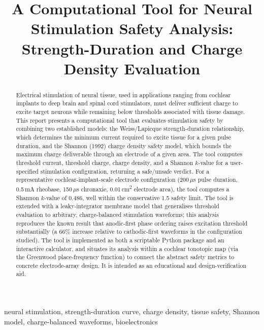 \documentclass[conference]{IEEEtran}
\begin{document}
\title{A Computational Tool for Neural Stimulation Safety Analysis: Strength-Duration and Charge Density Evaluation}

\author{
}

\maketitle

\begin{abstract}
Electrical stimulation of neural tissue, used in applications ranging from cochlear implants to deep brain and spinal cord stimulators, must deliver sufficient charge to excite target neurons while remaining below thresholds associated with tissue damage. This report presents a computational tool that evaluates stimulation safety by combining two established models: the Weiss/Lapicque strength-duration relationship, which determines the minimum current required to excite tissue for a given pulse duration, and the Shannon (1992) charge density safety model, which bounds the maximum charge deliverable through an electrode of a given area. The tool computes threshold current, threshold charge, charge density, and a Shannon $k$-value for a user-specified stimulation configuration, returning a safe/unsafe verdict. For a representative cochlear-implant-scale electrode configuration (200\,$\mu$s pulse duration, 0.5\,mA rheobase, 150\,$\mu$s chronaxie, 0.01\,cm\textsuperscript{2} electrode area), the tool computes a Shannon $k$-value of 0.486, well within the conservative 1.5 safety limit. The tool is extended with a leaky-integrator membrane model that generalises threshold evaluation to arbitrary, charge-balanced stimulation waveforms; this analysis reproduces the known result that anodic-first phase ordering raises excitation threshold substantially (a 66\% increase relative to cathodic-first waveforms in the configuration studied). The tool is implemented as both a scriptable Python package and an interactive calculator, and situates its analysis within a cochlear tonotopic map (via the Greenwood place-frequency function) to connect the abstract safety metrics to concrete electrode-array design. It is intended as an educational and design-verification aid.
\end{abstract}

\begin{IEEEkeywords}
neural stimulation, strength-duration curve, charge density, tissue safety, Shannon model, charge-balanced waveforms, bioelectronics
\end{IEEEkeywords}
\end{document}
